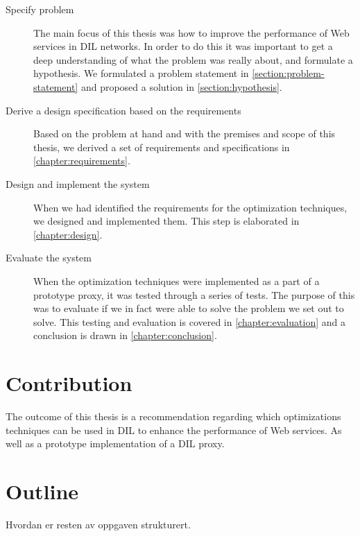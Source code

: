 \begin{description}

    \item[Specify problem] The main focus of this thesis was how to improve the
    performance of Web services in DIL networks. In order to do this it was
    important to get a deep understanding of what the problem was really about,
    and formulate a hypothesis. We formulated a problem statement in
    \cref{section:problem-statement} and proposed a solution in
    \cref{section:hypothesis}.

    \item[Derive a design specification based on the requirements] Based on the
    problem at hand and with the premises and scope of this thesis, we derived a
    set of requirements and specifications in \cref{chapter:requirements}.

    \item[Design and implement the system] When we had identified the
    requirements for the optimization techniques, we designed and implemented
    them. This step is elaborated in \cref{chapter:design}.

    \item[Evaluate the system] When the optimization techniques were implemented
    as a part of a prototype proxy, it was tested through a series of tests. The
    purpose of this was to evaluate if we in fact were able to solve the problem
    we set out to solve. This testing and evaluation is covered in
    \cref{chapter:evaluation} and a conclusion is drawn in
    \cref{chapter:conclusion}.

\end{description}



\section{Contribution}

The outcome of this thesis is a recommendation regarding which optimizations
techniques can be used in DIL to enhance the performance of Web services. As
well as a prototype implementation of a DIL proxy.

\section{Outline}
Hvordan er resten av oppgaven strukturert.
